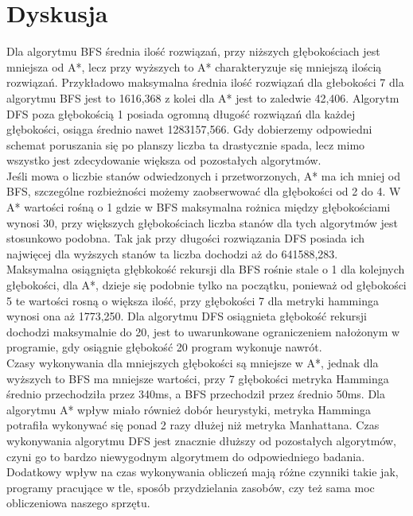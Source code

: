 \documentclass{classrep}
\begin{document}
\section{Dyskusja}
{
	Dla algorytmu BFS średnia ilość rozwiązań, przy niższych głębokościach jest mniejsza od A*, lecz przy wyższych to A* charakteryzuje się mniejszą ilością rozwiązań. 
Przykładowo maksymalna średnia ilość rozwiązań dla głebokości 7 dla algorytmu BFS jest to 1616,368 z kolei dla A* jest to zaledwie 42,406. Algorytm DFS poza głębokością 1 posiada ogromną długość rozwiązań dla każdej głębokości, osiąga średnio nawet 1283157,566. Gdy dobierzemy odpowiedni schemat poruszania się po planszy liczba ta drastycznie spada, lecz mimo wszystko jest zdecydowanie większa od pozostałych algorytmów.
 \\	 Jeśli mowa o liczbie stanów odwiedzonych i przetworzonych, A* ma ich mniej od BFS, szczególne rozbieżności możemy zaobserwować dla głębokości od 2 do 4. W A* wartości rośną o 1 gdzie w BFS maksymalna rożnica między głębokościami wynosi 30, przy większych głębokościach liczba stanów dla tych algorytmów jest stosunkowo podobna. Tak jak przy długości rozwiązania DFS posiada ich najwięcej dla wyższych stanów ta liczba dochodzi aż do 641588,283.
\\ 	Maksymalna osiągnięta głębkokość rekursji dla BFS rośnie stale o 1 dla kolejnych głębokości, dla A*, dzieje się podobnie tylko na początku, ponieważ od głębokości 5 te wartości rosną o większa ilość, przy głębokości 7 dla metryki hamminga wynosi ona aż 1773,250. Dla algorytmu DFS osiągnieta głębokość rekursji dochodzi maksymalnie do 20, jest to uwarunkowane ograniczeniem nałożonym w programie, gdy osiągnie głębokość 20 program wykonuje nawrót.
\\	Czasy wykonywania dla mniejszych głębokości są mniejsze w A*, jednak dla wyższych to BFS ma mniejsze wartości, przy 7 głębokości metryka Hamminga średnio przechodziła przez 340ms, a BFS przechodził przez średnio 50ms. Dla algorytmu A* wpływ miało również dobór heurystyki, metryka Hamminga potrafiła wykonywać się ponad 2 razy dłużej niż metryka Manhattana. Czas wykonywania algorytmu DFS jest znacznie dłuższy od pozostałych algorytmów, czyni go to bardzo niewygodnym algorytmem do odpowiedniego badania. Dodatkowy wpływ na czas wykonywania obliczeń mają różne czynniki takie jak, programy pracujące w tle,
sposób przydzielania zasobów, czy też sama moc obliczeniowa naszego sprzętu.
}
\end{document}
